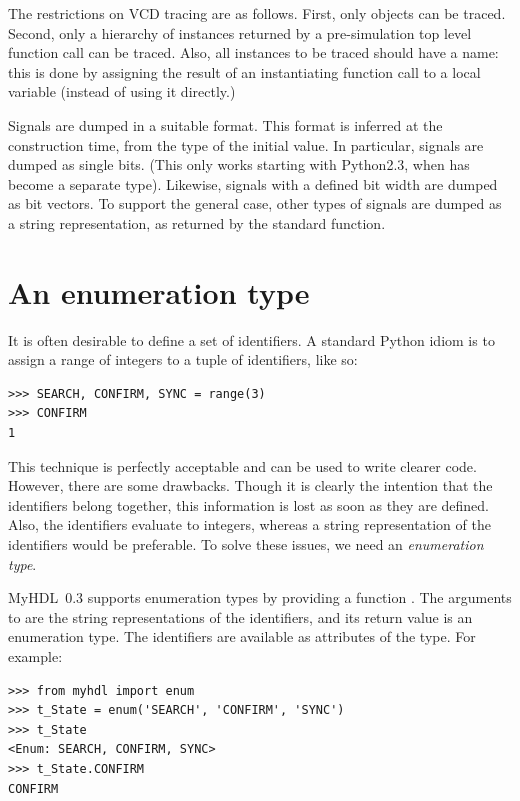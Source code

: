 \documentclass{howto}
\newcommand{\myhdl}{\protect \mbox{MyHDL}}
\begin{document}
The restrictions on VCD tracing are as follows. First, only
 objects can be traced. Second, only a hierarchy of
instances returned by a pre-simulation top level function call can be
traced. Also, all instances to be traced should have a name: this is
done by assigning the result of an instantiating function call to a
local variable (instead of using it directly.)

Signals are dumped in a suitable format. This format is inferred at
the  construction time, from the type of the initial
value. In particular,  signals are dumped as single
bits. (This only works starting with Python2.3, when  has
become a separate type).  Likewise,  signals with a
defined bit width are dumped as bit vectors. To support the general
case, other types of signals are dumped as a string representation, as
returned by the standard  function.

\section{An enumeration type\label{section-enum}}

It is often desirable to define a set of identifiers.  A standard
Python idiom is to assign a range of integers to a tuple of
identifiers, like so:

\begin{verbatim}
>>> SEARCH, CONFIRM, SYNC = range(3)
>>> CONFIRM
1
\end{verbatim}

This technique is perfectly acceptable and can be used to write
clearer code. However, there are some drawbacks. Though it is clearly
the intention that the identifiers belong together, this information
is lost as soon as they are defined. Also, the identifiers evaluate to
integers, whereas a string representation of the identifiers
would be preferable. To solve these issues, we need an
\emph{enumeration type}.

\myhdl\ 0.3 supports enumeration types by providing a function
.  The arguments to  are the string
representations of the identifiers, and its return value is an
enumeration type. The identifiers are available as attributes of the
type. For example:

\begin{verbatim}
>>> from myhdl import enum
>>> t_State = enum('SEARCH', 'CONFIRM', 'SYNC')
>>> t_State
<Enum: SEARCH, CONFIRM, SYNC>
>>> t_State.CONFIRM
CONFIRM
\end{verbatim}
\end{document}
